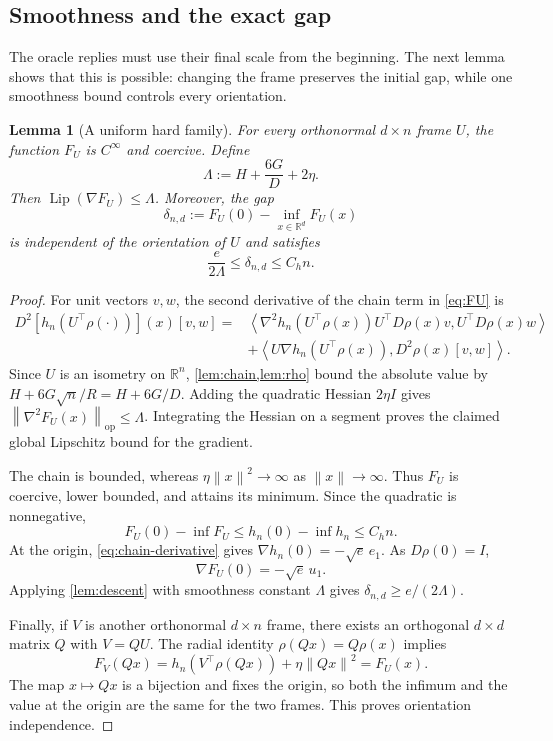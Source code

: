 \documentclass[11pt]{article}
\numberwithin{equation}{section}
\newtheorem{lemma}[lemma]{Lemma}
\theoremstyle{definition}
\theoremstyle{remark}
\newcommand{\R}{\mathbb{R}}
\newcommand{\norm}[1]{\left\lVert #1\right\rVert}
\newcommand{\ip}[2]{\left\langle #1,#2\right\rangle}
\newcommand{\Lip}{\operatorname{Lip}}
\begin{document}
\subsection{Smoothness and the exact gap}

The oracle replies must use their final scale from the beginning. The next
lemma shows that this is possible: changing the frame preserves the initial
gap, while one smoothness bound controls every orientation.

\begin{lemma}[A uniform hard family]
\label{lem:family}
For every orthonormal $d\times n$ frame $U$, the function $F_U$ is $C^\infty$
and coercive. Define
\begin{equation}
    \Lambda:=H+\frac{6G}{D}+2\eta.
    \label{eq:Lambda}
\end{equation}
Then $\Lip(\nabla F_U)\leq\Lambda$.
Moreover, the gap
\begin{equation}
    \delta_{n,d}:=F_U(0)-\inf_{x\in\R^d}F_U(x)
    \label{eq:gap-nd}
\end{equation}
is independent of the orientation of $U$ and satisfies
\begin{equation}
    \frac{e}{2\Lambda}\leq\delta_{n,d}\leq C_hn.
    \label{eq:gap-bounds}
\end{equation}
\end{lemma}

\begin{proof}
For unit vectors $v,w$, the second derivative of the chain term in
\eqref{eq:FU} is
\begin{align*}
 D^2[h_n(U^\top\rho(\cdot))](x)[v,w]
 ={}&\ip{\nabla^2h_n(U^\top\rho(x))U^\top D\rho(x)v}
              {U^\top D\rho(x)w}\\
 &+\ip{U\nabla h_n(U^\top\rho(x))}{D^2\rho(x)[v,w]}.
\end{align*}
Since $U$ is an isometry on $\R^n$, \cref{lem:chain,lem:rho} bound the
absolute value by $H+6G\sqrt n/R=H+6G/D$.
Adding the quadratic Hessian $2\eta I$ gives
$\norm{\nabla^2F_U(x)}_{\mathrm{op}}\leq\Lambda$.
Integrating the Hessian on a segment proves the claimed global Lipschitz
bound for the gradient.

The chain is bounded, whereas $\eta\norm{x}^2\to\infty$ as
$\norm{x}\to\infty$. Thus $F_U$ is coercive, lower bounded, and attains its
minimum. Since the quadratic is nonnegative,
\[
    F_U(0)-\inf F_U\leq h_n(0)-\inf h_n\leq C_hn.
\]
At the origin, \eqref{eq:chain-derivative} gives
$\nabla h_n(0)=-\sqrt e\,e_1$. As $D\rho(0)=I$,
\begin{equation}
    \nabla F_U(0)=-\sqrt e\,u_1.
    \label{eq:gradient-origin}
\end{equation}
Applying \cref{lem:descent} with smoothness constant $\Lambda$ gives
$\delta_{n,d}\geq e/(2\Lambda)$.

Finally, if $V$ is another orthonormal $d\times n$ frame, there exists an
orthogonal $d\times d$ matrix $Q$ with $V=QU$. The radial identity
$\rho(Qx)=Q\rho(x)$ implies
\[
    F_V(Qx)=h_n(V^\top\rho(Qx))+\eta\norm{Qx}^2=F_U(x).
\]
The map $x\mapsto Qx$ is a bijection and fixes the origin, so both the
infimum and the value at the origin are the same for the two frames.
This proves orientation independence.
\end{proof}
\end{document}
